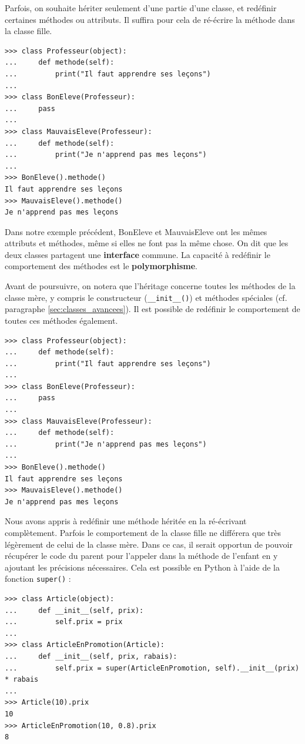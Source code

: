 \documentclass[12pt, a4paper]{article}
\begin{document}
Parfois, on souhaite hériter seulement d'une partie d'une classe, et redéfinir certaines méthodes ou attributs. Il suffira pour cela de ré-écrire la méthode dans la classe fille.
\begin{lstlisting}
>>> class Professeur(object):
...     def methode(self):
...         print("Il faut apprendre ses leçons")
...
>>> class BonEleve(Professeur): 
...     pass
...
>>> class MauvaisEleve(Professeur):
...     def methode(self):
...         print("Je n'apprend pas mes leçons")
...
>>> BonEleve().methode()
Il faut apprendre ses leçons
>>> MauvaisEleve().methode()
Je n'apprend pas mes leçons
\end{lstlisting}


Dans notre exemple précédent, BonEleve et MauvaisEleve ont les mêmes attributs et méthodes, même si elles ne font pas la même chose. On dit que les deux classes partagent une \textbf{interface} commune. La capacité à redéfinir le comportement des méthodes est le \textbf{polymorphisme}.

Avant de poursuivre, on notera que l'héritage concerne toutes les méthodes de la classe mère, y compris le constructeur (\lstinline{__init__()}) et méthodes spéciales (cf. paragraphe \ref{sec:classes_avancees}). Il est possible de redéfinir le comportement de toutes ces méthodes également.
\begin{lstlisting}
>>> class Professeur(object):
...     def methode(self):
...         print("Il faut apprendre ses leçons")
...
>>> class BonEleve(Professeur): 
...     pass
...
>>> class MauvaisEleve(Professeur):
...     def methode(self):
...         print("Je n'apprend pas mes leçons")
...
>>> BonEleve().methode()
Il faut apprendre ses leçons
>>> MauvaisEleve().methode()
Je n'apprend pas mes leçons
\end{lstlisting}

Nous avons appris à redéfinir une méthode héritée en la ré-écrivant complètement. Parfois le comportement de la classe fille ne différera que très légèrement de celui de la classe mère. Dans ce cas, il serait opportun de pouvoir récupérer le code du parent pour l'appeler dans la méthode de l'enfant en y ajoutant les précisions nécessaires. Cela est possible en Python à l'aide de la fonction \lstinline{super()} :
\begin{lstlisting}
>>> class Article(object):
...     def __init__(self, prix):
...         self.prix = prix
...
>>> class ArticleEnPromotion(Article): 
...     def __init__(self, prix, rabais):
...         self.prix = super(ArticleEnPromotion, self).__init__(prix) * rabais
...
>>> Article(10).prix
10
>>> ArticleEnPromotion(10, 0.8).prix
8
\end{lstlisting}
\end{document}
